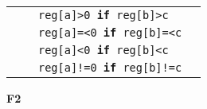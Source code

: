 {\begin{tabular}{llll}
                                &                                       &   \texttt{reg[a]>0 \textbf{if} reg[b]>c}              \\
                                &                                       &   \texttt{reg[a]=<0 \textbf{if} reg[b]=<c}            \\
                                &                                       &   \texttt{reg[a]<0 \textbf{if} reg[b]<c}              \\
                                &                                       &   \texttt{reg[a]!=0 \textbf{if} reg[b]!=c}            \\
        \hline
    \end{tabular}
}
\clearpage

\par{
    \noindent
    \textbf{F2}
}


